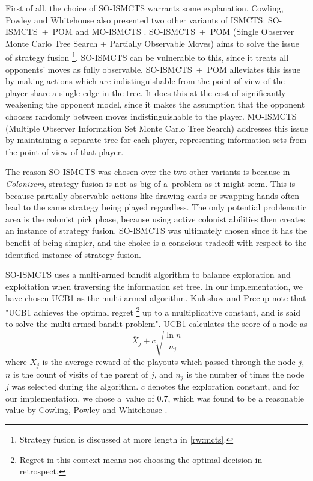 First of all, the choice of SO-ISMCTS warrants some explanation. Cowling, Powley
and Whitehouse also presented two other variants of ISMCTS: SO-ISMCTS~+~POM and
MO-ISMCTS \cite{Cowling12}. SO-ISMCTS~+~POM (Single Observer Monte Carlo
Tree Search + Partially Observable Moves) aims to solve the issue of
strategy fusion
\footnote{Strategy fusion is discussed at more length in \autoref{rw:mcts}.}.
SO-ISMCTS can be vulnerable to this, since it treats all
opponents' moves as fully observable. SO-ISMCTS~+~POM alleviates this issue
by making actions which are indistinguishable from the point of view of the player
share a single edge in the tree. It does this at the cost of significantly weakening
the opponent model, since it makes the assumption that the opponent chooses randomly
between moves indistinguishable to the player. MO-ISMCTS (Multiple Observer Information
Set Monte Carlo Tree Search) addresses this issue by maintaining a separate tree
for each player, representing information sets from the point of view of that player.

The reason SO-ISMCTS was chosen over the two other variants is because in \emph{Colonizers},
strategy fusion is not as big of a~problem as it might seem. This is because
partially observable actions like drawing cards or swapping hands often lead to the
same strategy being played regardless. The only potential problematic area
is the colonist pick phase, because using active colonist abilities then
creates an instance of strategy fusion. SO-ISMCTS was ultimately chosen
since it has the benefit of being simpler, and the choice is a conscious
tradeoff with respect to the identified instance of strategy fusion.

SO-ISMCTS uses a multi-armed bandit algorithm to balance exploration
and exploitation when traversing the information set tree.
In our implementation, we have chosen UCB1 as the multi-armed algorithm.
Kuleshov and Precup \cite{Kuleshov00} note that "UCB1 achieves the optimal regret
\footnote{Regret in this context means not choosing the optimal decision in
retrospect.} up to a
multiplicative constant, and is said to solve the multi-armed bandit problem".
UCB1 calculates the score of a node as
$$\overline{X}_{j} + c\sqrt{\frac{\ln{n}}{n_{j}}}$$
where $\overline{X}_{j}$ is the average reward of the playouts which passed through
the node $j$, $n$ is the count of visits of the parent of $j$, and $n_{j}$
is the number of times the node $j$ was selected during the algorithm.
$c$ denotes the exploration constant, and for our implementation, we chose a~value
of $0.7$, which was found to be a reasonable value by Cowling, Powley and Whitehouse
\cite{Cowling12}.

